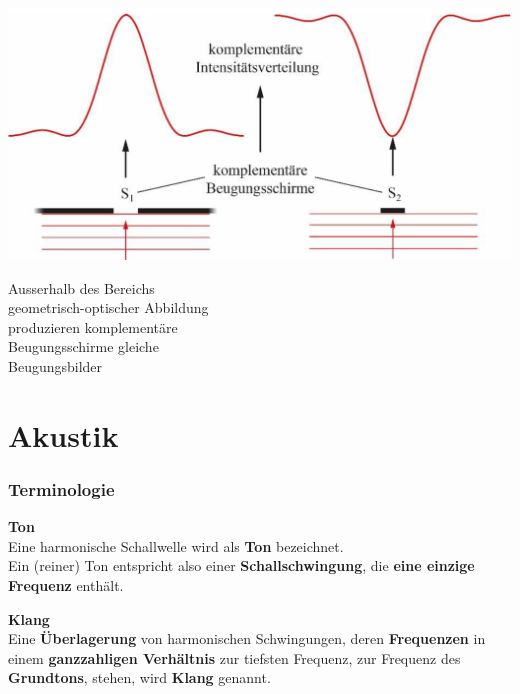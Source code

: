 \begin{minipage}{0.48\linewidth}
\includegraphics[width=0.98\linewidth]{Bilder/Wellen-Optik/babinet_prinzip} \\
\end{minipage}
\hfill
\begin{minipage}{0.48\linewidth}

Ausserhalb des Bereichs \\
geometrisch-optischer Abbildung\\
produzieren komplementäre\\
Beugungsschirme gleiche \\
Beugungsbilder
\end{minipage}





\section{Akustik}

\subsubsection{Terminologie}

\textbf{Ton}\\
Eine harmonische Schallwelle wird als \textbf{Ton} bezeichnet. \\
Ein (reiner) Ton entspricht also einer \textbf{Schallschwingung}, die \textbf{eine
einzige Frequenz} enthält. \\
\vspace{0.2cm}

\textbf{Klang} \\
Eine \textbf{Überlagerung} von harmonischen Schwingungen, deren
\textbf{Frequenzen} in einem \textbf{ganzzahligen Verhältnis} zur tiefsten
Frequenz, zur Frequenz des \textbf{Grundtons}, stehen, wird \textbf{Klang}
genannt. \\
\vspace{0.2cm}

